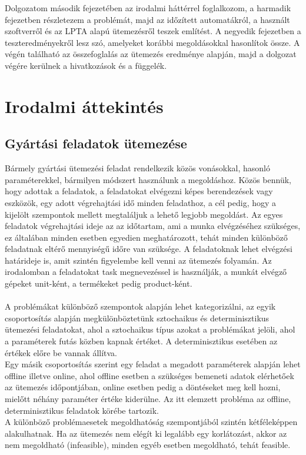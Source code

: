 \documentclass {report}
\begin{document}
Dolgozatom második fejezetében az irodalmi háttérrel foglalkozom, a harmadik fejezetben részletezem a problémát, majd az időzített automatákról, a használt szoftverről és az LPTA alapú ütemezésről teszek említést. A negyedik fejezetben a teszteredményekről lesz szó, amelyeket korábbi megoldásokkal hasonlítok össze. A végén található az összefoglalás az ütemezés eredménye alapján, majd a dolgozat végére kerülnek a hivatkozások és a függelék. 


\chapter{Irodalmi áttekintés}
\section{Gyártási feladatok ütemezése}
Bármely gyártási ütemezési feladat rendelkezik közös vonásokkal, hasonló paraméterekkel, bármilyen módszert használunk a megoldáshoz. Közös bennük, hogy adottak a feladatok, a feladatokat elvégezni képes berendezések vagy eszközök, egy adott végrehajtási idő minden feladathoz, a cél pedig, hogy a kijelölt szempontok mellett megtaláljuk a lehető legjobb megoldást. Az egyes feladatok  végrehajtási ideje az az  időtartam, ami a munka elvégzéséhez szükséges, ez általában minden esetben egyedien meghatározott, tehát minden különböző feladatnak eltérő mennyiségű időre van szüksége. A feladatoknak lehet elvégzési határideje is, amit szintén figyelembe kell venni az ütemezés folyamán. Az irodalomban a feladatokat task megnevezéssel is használják, a munkát elvégző gépeket unit-ként, a termékeket pedig product-ként. \\\\
A problémákat különböző szempontok alapján lehet kategorizálni, az egyik csoportosítás alapján megkülönböztetünk sztochaikus és determinisztikus ütemezési feladatokat, ahol a sztochaikus típus azokat a problémákat jelöli, ahol a paraméterek futás közben kapnak értéket. A determinisztikus esetében az értékek előre be vannak állítva. \\
Egy másik csoportosítás szerint egy feladat a megadott paraméterek alapján lehet offline illetve online, ahol offline esetben a szükséges bemeneti adatok elérhetőek az ütemezés időpontjában, online esetben pedig a döntéseket meg kell hozni, mielőtt néhány paraméter értéke kiderülne. Az itt elemzett probléma az offline, determinisztikus feladatok körébe tartozik.\\
A különböző problémaesetek megoldhatóság szempontjából szintén kétféleképpen alakulhatnak. Ha az ütemezés nem elégít ki legalább egy korlátozást, akkor az nem megoldható (infeasible), minden egyéb esetben megoldható, tehát feasible. \\\\
\end{document}
